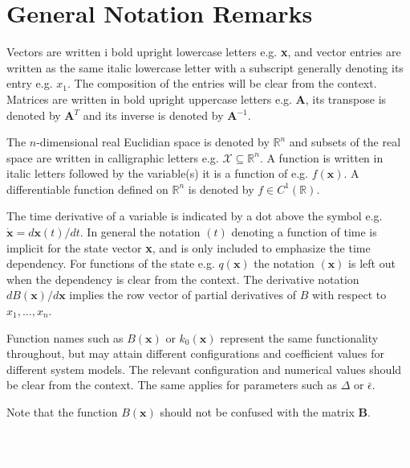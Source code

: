 \section*{General Notation Remarks}
\vspace{0.1cm}

Vectors are written i bold upright lowercase letters e.g. \textbf{x}, and vector entries are written as the same italic lowercase letter with a subscript generally denoting its entry e.g. $x_1$. The composition of the entries will be clear from the context.
Matrices are written in bold upright uppercase letters e.g. \textbf{A}, its transpose is denoted by \textbf{A}$^T$ and its inverse  is denoted by \textbf{A}$^{-1}$.

The $n$-dimensional real Euclidian space is denoted by $\mathbb{R}^n$ and subsets of the real space are written in calligraphic letters e.g. $\mathcal{X}\subseteq \mathbb{R}^n$. 
A function is written in italic letters followed by the variable(s) it is a function of e.g. $f(\mathbf{x})$. A differentiable function defined on $\mathbb{R}^n$ is denoted by $f\in C^1(\mathbb{R})$.

The time derivative of a variable is indicated by a dot above the symbol e.g. $\dot{\mathbf{x}} = d\mathbf{x}(t)/dt$. In general the notation $(t)$ denoting a function of time is implicit for the state vector \textbf{x}, and is only included to emphasize the time dependency. For functions of the state e.g. $q(\mathbf{x})$  the notation $(\mathbf{x})$ is left out when the dependency is clear from the context. The derivative notation $dB(\mathbf{x})/d\mathbf{x}$ implies the row vector of partial derivatives of $B$ with respect to $x_1,...,x_n$. 

Function names such as $B(\mathbf{x})$ or $k_0(\mathbf{x})$ represent the same functionality throughout, but may attain different configurations and  coefficient values for different system models. The relevant configuration and numerical values should be clear from the context. The same applies for parameters such as $\Delta$ or $\bar{\epsilon}$.

Note that the function $B(\mathbf{x})$ should not be confused with the matrix \textbf{B}.









\textcolor{white}{%
	\gls{injective_func} \gls{surjective_func} \gls{bijective_func}  \gls{compact_space}  \gls{extrinsic} \gls{intrinsic} \gls{tcp} \gls{Ts} \gls{y} \gls{radius_vec} \gls{center_vec}}